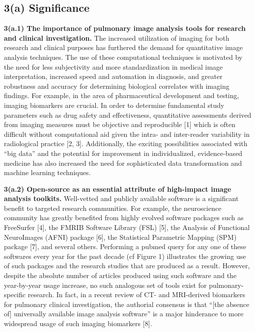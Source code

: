 \documentclass[11pt,]{article}
\begin{document}
\subsection{\textbf{3(a) Significance}}\label{a-significance}

\textbf{3(a.1) The importance of pulmonary image analysis tools for
research and clinical investigation.} The increased utilization of
imaging for both research and clinical purposes has furthered the demand
for quantitative image analysis techniques. The use of these
computational techniques is motivated by the need for less subjectivity
and more standardization in medical image interpretation, increased
speed and automation in diagnosis, and greater robustness and accuracy
for determining biological correlates with imaging findings. For
example, in the area of pharmaceutical development and testing, imaging
biomarkers are crucial. In order to determine fundamental study
parameters such as drug safety and effectiveness, quantitative
assessments derived from imaging measures must be objective and
reproducible {[}1{]} which is often difficult without computational aid
given the intra- and inter-reader variability in radiological practice
{[}2, 3{]}. Additionally, the exciting possibilities associated with
``big data'' and the potential for improvement in individualized,
evidence-based medicine has also increased the need for sophisticated
data transformation and machine learning techniques.

\textbf{3(a.2) Open-source as an essential attribute of high-impact
image analysis toolkits.} Well-vetted and publicly available software is
a significant benefit to targeted research communities. For example, the
neuroscience community has greatly benefited from highly evolved
software packages such as FreeSurfer {[}4{]}, the FMRIB Software Library
(FSL) {[}5{]}, the Analysis of Functional NeuroImages (AFNI) package
{[}6{]}, the Statistical Parametric Mapping (SPM) package {[}7{]}, and
several others. Performing a pubmed query for any one of these softwares
every year for the past decade (cf Figure 1) illustrates the growing use
of such packages and the research studies that are produced as a result.
However, despite the absolute number of articles produced using such
software and the year-by-year usage increase, no such analogous set of
tools exist for pulmonary-specific research. In fact, in a recent review
of CT- and MRI-derived biomarkers for pulmonary clinical investigation,
the authorial consensus is that ``{[}the absence of{]} universally
available image analysis software'' is a major hinderance to more
widespread usage of such imaging biomarkers {[}8{]}.
\end{document}
